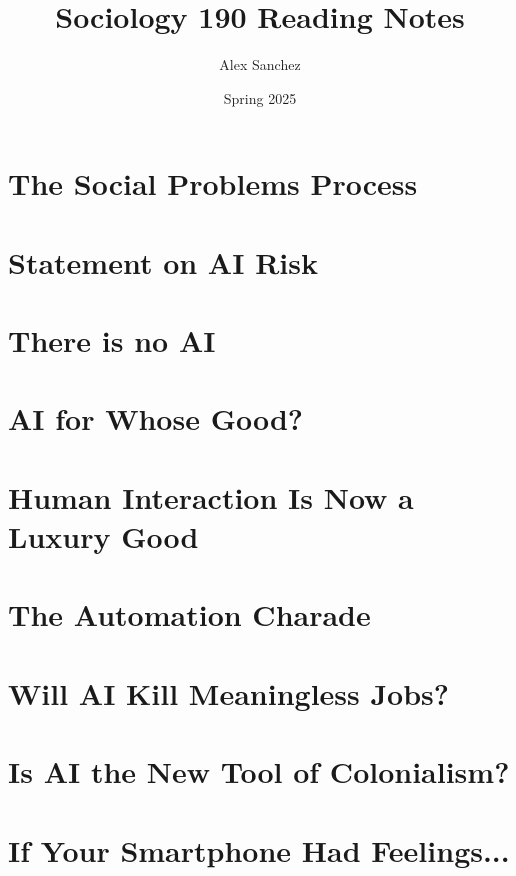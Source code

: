 \documentclass[openany]{book}
\title{Sociology 190 Reading Notes}
\author{Alex Sanchez}
\date{Spring 2025}
\begin{document}
\maketitle

\chapter{The Social Problems Process}

\chapter{Statement on AI Risk}

\chapter{There is no AI}

\chapter{AI for Whose Good?}


\chapter{Human Interaction Is Now a Luxury Good}


\chapter{The Automation Charade}



\chapter{Will AI Kill Meaningless Jobs?}



\chapter{Is AI the New Tool of Colonialism?}


\chapter{If Your Smartphone Had Feelings...}

\end{document}
